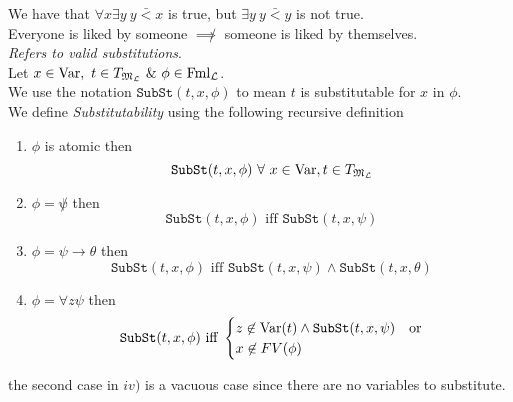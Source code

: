 \documentclass[11pt,a4paper]{article}
\begin{document}
We have that $\forall x\exists y\ y\bar<x$ is true, but $\exists y\ y\bar<y$ is not true.\\
\ie Everyone is liked by someone $\not\implies$ someone is liked by themselves.\\

\textit{Refers to valid substitutions}.\\
Let $x\in\var,\ t\in T_{\M_\LL}\ \&\ \phi\in\text{Fml}_\LL$.\\
We use the notation $\mathtt{SubSt}(t,x,\phi)$ to mean $t$ is substitutable for $x$ in $\phi$.\\
We define \textit{Substitutability} using the following recursive definition
\begin{enumerate}
	\item $\phi$ is atomic then
	$$\mathtt{SubSt}(t,x,\phi)\ \forall\ x\in\var,t\in T_{\M_\LL}$$
	\item $\phi=\not\psi$ then
	$$\mathtt{SubSt}(t,x,\phi)\text{ iff }\mathtt{SubSt}(t,x,\psi)$$
	\item $\phi=\psi\to\theta$ then
	$$\mathtt{SubSt}(t,x,\phi)\text{ iff }\mathtt{SubSt}(t,x,\psi)\wedge\mathtt{SubSt}(t,x,\theta)$$
	\item $\phi=\forall z\psi$ then
	$$\mathtt{SubSt}(t,x,\phi)\text{ iff }\begin{cases}z\not\in\mathrm{Var}(t)\wedge\mathtt{SubSt}(t,x,\psi)&\text{or}\\x\not\in FV(\phi)\end{cases}$$
\end{enumerate}
\nb the second case in $iv)$ is a vacuous case since there are no variables to substitute.\\
\end{document}
